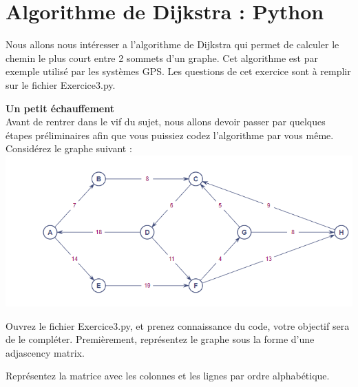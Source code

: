 \section{Algorithme de Dijkstra : Python}
Nous allons nous intéresser a l'algorithme de Dijkstra qui permet de calculer le chemin le plus court entre 2 sommets d'un graphe. Cet algorithme est par exemple utilisé par les systèmes GPS. Les questions de cet exercice sont à remplir sur le fichier Exercice3.py. \\
\begin{Exercice}[10 minutes]\textbf{Un petit échauffement}\\

Avant de rentrer dans le vif du sujet, nous allons devoir passer par quelques étapes préliminaires afin que vous puissiez codez l'algorithme par vous même. Considérez le graphe suivant :\\
\includegraphics[]{Week 7/Dijkstra.PNG}

Ouvrez le fichier Exercice3.py, et prenez connaissance du code, votre objectif sera de le compléter. Premièrement, représentez le graphe sous la forme d'une adjascency matrix.
\end{Exercice}
\begin{conseil}
    Représentez la matrice avec les colonnes et les lignes par ordre alphabétique.
\end{conseil}
\begin{solution}
    
\end{solution}
\newpage

